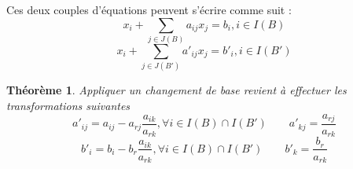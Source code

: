 \documentclass[a4paper]{report}
\theoremstyle{definition}
\theoremstyle{remark}
\theoremstyle{plain}
\newtheorem{theorem}{Théorème}
\begin{document}
Ces deux couples d'équations peuvent s'écrire comme suit :
\begin{equation}
\label{eq:base-general}
x_i + \sum_{j \in J(B)}{a_{ij}x_j} = b_i , i \in I(B)
\end{equation}
\begin{equation}
\label{eq:base'-general}
x_i + \sum_{j \in J(B')}{a'_{ij}x_j} = b'_i , i \in I(B')
\end{equation}

\begin{theorem}
Appliquer un changement de base revient à effectuer les transformations suivantes
\[a'_{ij} = a_{ij} - a_{rj} \frac{a_{ik}}{a_{rk}}, \forall i \in I(B) \cap I(B') \qquad a'_{kj} = \frac{a_{rj}}{a_{rk}}\]
\[b'_i = b_i - b_r \frac{a_{ik}}{a_{rk}}, \forall i \in I(B) \cap I(B') \qquad b'_{k} = \frac{b_r}{a_{rk}}\]
\end{theorem}
\end{document}
